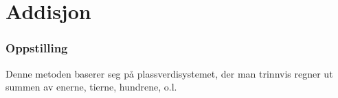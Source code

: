 



\section{Addisjon}

\subsubsection{Oppstilling}
Denne metoden baserer seg på plassverdisystemet, der man trinnvis regner ut summen av enerne, tierne, hundrene, o.l.
\begin{center}
	\parbox{0.3\linewidth}{
}\qquad
\parbox{0.3\linewidth}{
}\\[12pt]
\parbox{0.3\linewidth}{
}\qquad
\parbox{0.3\linewidth}{
}
\end{center}

